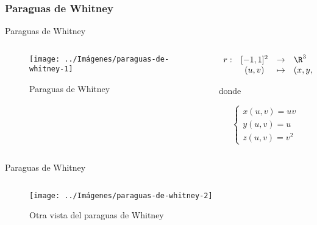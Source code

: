 \documentclass[10pt]{beamer}
\begin{document}
	\subsubsection{Paraguas de Whitney}
	
	\begin{frame}{Paraguas de Whitney}
		\begin{columns}[t] %
			\begin{column}{.50\textwidth}
				\begin{figure}
					\centering
					\texttt{[image: ../Imágenes/paraguas-de-whitney-1]}
					\caption{Paraguas de Whitney}
					\label{fig:paraguas-de-Whitney-1}
				\end{figure}
			\end{column}%
			\hfill%
			\begin{column}{.50\textwidth}
				$$\begin{array}{rcll}
				r : & [-1, 1]^2 & \to & \R^3\\
				& (u,v) & \mapsto & (x,y,z)
				\end{array}$$
				
				donde 
				
				$$ \begin{cases}
				x(u,v) = uv \\
				y(u,v) = u \\
				z(u,v) = v^2
				\end{cases} $$
			\end{column}%
		\end{columns}
	\end{frame}
	
	\begin{frame}{Paraguas de Whitney}
		\begin{columns}[t] %
			\begin{column}{.50\textwidth}
				\begin{figure}
					\centering
					\texttt{[image: ../Imágenes/paraguas-de-whitney-2]}
					\caption{Otra vista del paraguas de Whitney}
					\label{fig:paraguas-de-Whitney-2}
				\end{figure}
			\end{column}%
			\hfill%
			\begin{column}{.50\textwidth}
			\end{column}%
		\end{columns}
	\end{frame}
	
\end{document}
